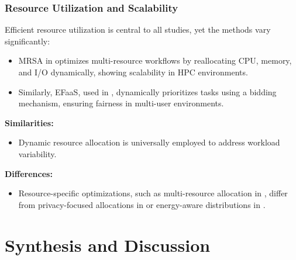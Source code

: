 \documentclass[a4paper, final]{article}
\begin{document}
\subsubsection{Resource Utilization and Scalability}
Efficient resource utilization is central to all studies, yet the methods vary significantly:
\begin{itemize}
    \item MRSA in \cite{bib:8} optimizes multi-resource workflows by reallocating CPU, memory, 
    and I/O dynamically, showing scalability in HPC environments.
    \item Similarly, EFaaS, used in \cite{bib:4_faas}, dynamically prioritizes tasks using a 
    bidding mechanism, ensuring fairness in multi-user environments.
\end{itemize}

\noindent \textbf{Similarities:}
\begin{itemize}
    \item Dynamic resource allocation is universally employed to address workload variability.
\end{itemize}

\noindent \textbf{Differences:}
\begin{itemize}
    \item Resource-specific optimizations, such as multi-resource allocation in \cite{bib:8}, differ 
    from privacy-focused allocations in \cite{bib:7_ppps} or energy-aware distributions in \cite{bib:5_epee}.
\end{itemize}

\section{Synthesis and Discussion}
\end{document}
